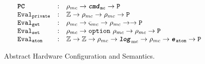 \begin{figure}
$$\begin{array}{llll}
\end{array}
$$
\noindent{}
$$
\begin{array}{llll}
\programcounterkwd & : &  \privatestate \rightarrow \command \rightarrow \mcprop\\
\privatestepkwd & : & \ztype  \rightarrow \privatestate \rightarrow \privatestate \rightarrow \mcprop \\
\getsharedstepkwd & : & \privatestate \rightarrow \sharedpiece \rightarrow \privatestate \rightarrow  \rightarrow \mcprop \\ 
\setsharedstepkwd & :  & \privatestate \rightarrow \optioncmd{\privatestate}  \rightarrow \privatestate \rightarrow \mcprop\\
\atomicstepkwd & : &  \ztype \rightarrow \ztype  \rightarrow \privatestate \rightarrow \mclog \rightarrow \privatestate \rightarrow \atomicevent \rightarrow \mcprop  \\
\end{array}
$$
\caption{Abstract Hardware Configuration and Semantics.}
\label{fig:chapter:conlinkg:abstract-hardware-configuration-and-semantics}
\end{figure}

